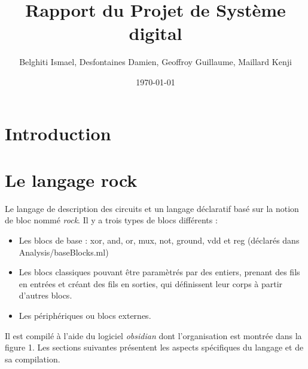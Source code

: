 \documentclass[13pt]{article}
\title{Rapport du Projet de Système digital \no3}
\author{Belghiti Ismael, Desfontaines Damien, Geoffroy Guillaume, Maillard Kenji}
\date{\today}
\begin{document}
\renewcommand{\labelitemi}{$\triangleright$}

\maketitle
\tableofcontents

\section{Introduction}



\section{Le langage rock}

Le langage de description des circuits et un langage déclaratif basé sur la notion de bloc nommé \emph{rock}. Il y a trois types de blocs différents :
\begin{itemize}
\item Les blocs de base : xor, and, or, mux, not, ground, vdd et reg (déclarés dans Analysis/baseBlocks.ml)
\item Les blocs classiques pouvant être paramètrés par des entiers, prenant des fils en entrées et créant des fils en sorties, qui définissent leur corps à partir d'autres blocs.
\item Les périphériques ou blocs externes.
\end{itemize}

Il est compilé à l'aide du logiciel \emph{obsidian} dont l'organisation est montrée dans la figure 1. Les sections suivantes présentent les aspects spécifiques du langage et de sa compilation.
\end{document}
